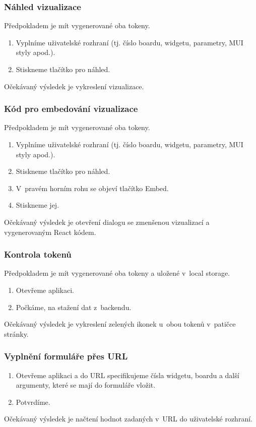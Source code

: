 \documentclass[czech, bc, kiv, he, iso690numb]{fasthesis}
\begin{document}
\subsubsection{Náhled vizualizace}
Předpokladem je mít vygenerované oba tokeny.
\begin{enumerate}
	\item Vyplníme uživatelské rozhraní (tj. číslo boardu, widgetu, parametry, MUI styly apod.).
	\item Stiskneme tlačítko pro náhled.
\end{enumerate}
Očekávaný výsledek je vykreslení vizualizace.

\subsubsection{Kód pro embedování vizualizace}
Předpokladem je mít vygenerované oba tokeny.
\begin{enumerate}
	\item Vyplníme uživatelské rozhraní (tj. číslo boardu, widgetu, parametry, MUI styly apod.).
	\item Stiskneme tlačítko pro náhled.
	\item V~pravém horním rohu se objeví tlačítko Embed.
	\item Stiskneme jej.
\end{enumerate}
Očekávaný výsledek je otevření dialogu se zmenšenou vizualizací a vygenerovaným React kódem.

\subsubsection{Kontrola tokenů}
Předpokladem je mít vygenerované oba tokeny a uložené v~local storage.

\begin{enumerate}
	\item Otevřeme aplikaci.
	\item Počkáme, na stažení dat z~backendu.
\end{enumerate}
Očekávaný výsledek je vykreslení zelených ikonek u~obou tokenů v~patičce stránky.

\subsubsection{Vyplnění formuláře přes URL}

\begin{enumerate}
	\item Otevřeme aplikaci a do URL specifikujeme čísla widgetu, boardu a další argumenty, které se mají do formuláře vložit.
	\item Potvrdíme.
\end{enumerate}
Očekávaný výsledek je načtení hodnot zadaných v~URL do uživatelské rozhraní.
\end{document}
